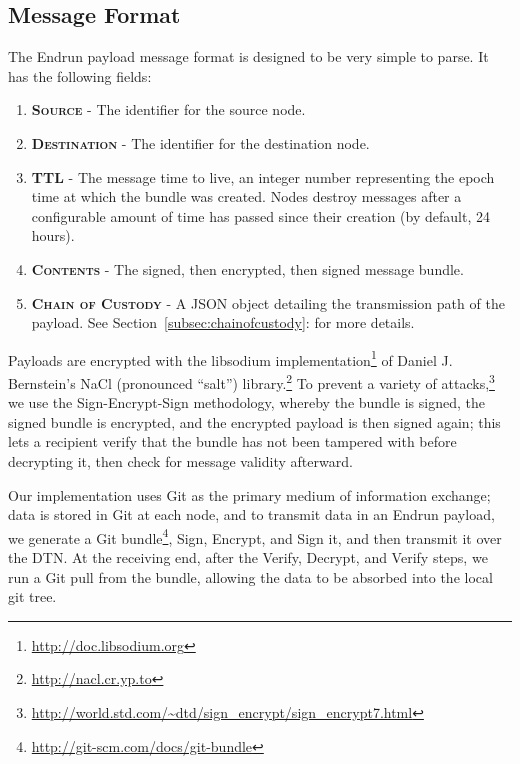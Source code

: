 \documentclass[12pt]{article}
\begin{document}
  \subsection{Message Format}
  
  The Endrun payload message format is designed to be very simple to parse. It has the following fields:
  
  \begin{enumerate}
    \item \textbf{\textsc{Source}} - The identifier for the source node.
    \item \textbf{\textsc{Destination}} - The identifier for the destination node.
    \item \textbf{\textsc{TTL}} - The message time to live, an integer number representing the epoch time at which the bundle was created. Nodes destroy messages after a configurable amount of time has passed since their creation (by default, 24 hours).
    \item \textbf{\textsc{Contents}} - The signed, then encrypted, then signed message bundle.
    \item \textbf{\textsc{Chain of Custody}} - A JSON object detailing the transmission path of the payload. See Section~\ref{subsec:chainofcustody}: for more details.

    \end{enumerate}
    
    Payloads are encrypted with the libsodium implementation\footnote{\url{http://doc.libsodium.org}} of Daniel J. Bernstein's NaCl (pronounced ``salt'') library.\footnote{\url{http://nacl.cr.yp.to}} To prevent a variety of attacks,\footnote{\url{http://world.std.com/~dtd/sign_encrypt/sign_encrypt7.html}} we use the Sign-Encrypt-Sign methodology, whereby the bundle is signed, the signed bundle is encrypted, and the encrypted payload is then signed again; this lets a recipient verify that the bundle has not been tampered with before decrypting it, then check for message validity afterward.
    
    Our implementation uses Git as the primary medium of information exchange; data is stored in Git at each node, and to transmit data in an Endrun payload, we generate a Git bundle\footnote{\url{http://git-scm.com/docs/git-bundle}}, Sign, Encrypt, and Sign it, and then transmit it over the DTN. At the receiving end, after the Verify, Decrypt, and Verify steps, we run a Git pull from the bundle, allowing the data to be absorbed into the local git tree.
    
\end{document}
